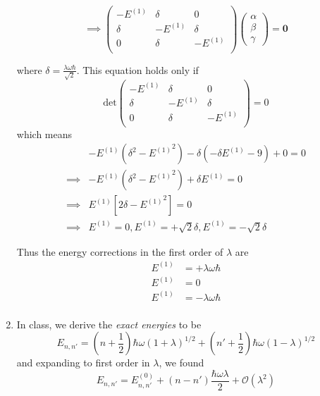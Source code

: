 \documentclass{article}
\begin{document}
\begin{enumerate}[label=(\alph*)]
  \[ \implies \begin{pmatrix}
    -E^{(1)} & \delta & 0 \\
    \delta & -E^{(1)} &  \delta  \\
    0 &  \delta  & -E^{(1)} \\
  \end{pmatrix} \begin{pmatrix}
    \alpha \\
    \beta \\
    \gamma 
  \end{pmatrix} = \mathbf{0}  \]

  where $\delta = \frac{\lambda \omega \hbar}{\sqrt{2}}$. This equation holds only if 
  \[ \text{det}\begin{pmatrix}
    -E^{(1)} & \delta & 0 \\
    \delta & -E^{(1)} &  \delta  \\
    0 &  \delta  & -E^{(1)} \\
  \end{pmatrix} = 0\]
  which means 
  \begin{align*}
    &-E^{(1)}(\delta^2 - {E^{(1)}}^2) - \delta(-\delta E^{(1)}  - 9) + 0 = 0\\
    \implies& - E^{(1)}(\delta^2 - {E^{(1)}}^2) + \delta E^{(1)} = 0 \\
    \implies& E^{(1)} \left[ 2 \delta - {E^{(1)}}^2 \right] = 0 \\
    \implies& \boxed{E^{(1)} = 0, E^{(1)} = + \sqrt{2} \delta, E^{(1)} = - \sqrt{2}\delta}
  \end{align*}

  Thus the energy corrections in the first order of $\lambda$ are 
  \begin{align*}
    E^{(1)} &= +\lambda \omega \hbar \\
    E^{(1)} &= 0 \\
    E^{(1)} &= -\lambda \omega \hbar \\
  \end{align*}


  \item In class, we derive the \emph{exact energies} to be 
  \[ E_{n,n'} = \left( n + \frac{1}{2} \right) \hbar\omega \left( 1 + \lambda \right)^{1/2} + \left( n' + \frac{1}{2} \right) \hbar\omega \left( 1 - \lambda \right)^{1/2} \]
  and expanding to first order in $\lambda$, we found 
  \[ E_{n,n'} = E_{n,n'}^{(0)} + (n - n') \frac{\hbar \omega \lambda}{2} + \mathcal{O}(\lambda^2) \]


\end{enumerate}
\end{document}
